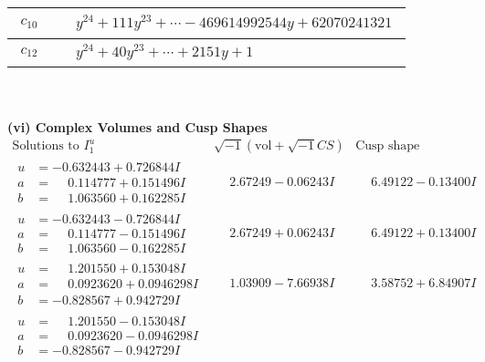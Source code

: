 \documentclass[1p]{elsarticle_modified}
\theoremstyle{definition}
\newcommand{\I}{\sqrt{-1}}
\begin{document}
\begin{tabular}{m{50pt}|m{274pt}}
\hline $$\begin{aligned}c_{10}\end{aligned}$$&$\begin{aligned}
&y^{24}+111 y^{23}+\cdots-469614992544 y+62070241321
\end{aligned}$\\
\hline $$\begin{aligned}c_{12}\end{aligned}$$&$\begin{aligned}
&y^{24}+40 y^{23}+\cdots+2151 y+1
\end{aligned}$\\
\hline
\end{tabular}\\~\\
\newpage\flushleft \textbf{(vi) Complex Volumes and Cusp Shapes}
$$\begin{array}{c|c|c}  
\text{Solutions to }I^u_{1}& \I (\text{vol} + \sqrt{-1}CS) & \text{Cusp shape}\\
 \hline 
\begin{aligned}
u &= -0.632443 + 0.726844 I \\
a &= \phantom{-}0.114777 + 0.151496 I \\
b &= \phantom{-}1.063560 + 0.162285 I\end{aligned}
 & \phantom{-}2.67249 - 0.06243 I & \phantom{-}6.49122 - 0.13400 I \\ \hline\begin{aligned}
u &= -0.632443 - 0.726844 I \\
a &= \phantom{-}0.114777 - 0.151496 I \\
b &= \phantom{-}1.063560 - 0.162285 I\end{aligned}
 & \phantom{-}2.67249 + 0.06243 I & \phantom{-}6.49122 + 0.13400 I \\ \hline\begin{aligned}
u &= \phantom{-}1.201550 + 0.153048 I \\
a &= \phantom{-}0.0923620 + 0.0946298 I \\
b &= -0.828567 + 0.942729 I\end{aligned}
 & \phantom{-}1.03909 - 7.66938 I & \phantom{-}3.58752 + 6.84907 I \\ \hline\begin{aligned}
u &= \phantom{-}1.201550 - 0.153048 I \\
a &= \phantom{-}0.0923620 - 0.0946298 I \\
b &= -0.828567 - 0.942729 I\end{aligned}

\end{array}$$
\end{document}
